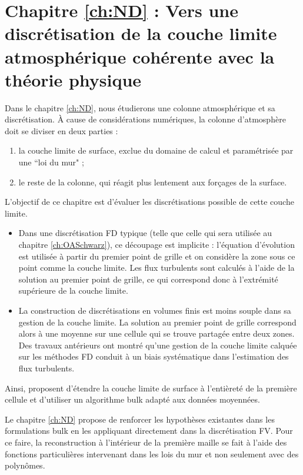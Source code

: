 \section*{Chapitre \ref{ch:ND} : Vers une discrétisation de la couche limite atmosphérique cohérente avec la théorie physique}
Dans le chapitre \ref{ch:ND}, nous étudierons une colonne atmosphérique et sa discrétisation.
À cause de considérations numériques, la colonne
d'atmosphère doit se diviser en deux parties :
\begin{enumerate}
	\item
	la couche limite de surface, exclue du domaine
	de calcul et paramétrisée par une ``loi du mur" ;
	\item
	le reste de la colonne, qui réagit plus lentement
	aux forçages de la surface.
\end{enumerate}
L'objectif de ce chapitre est d'évaluer les discrétisations possible
de cette couche limite.
\begin{itemize}
	\item
Dans une discrétisation FD typique (telle que celle qui sera
utilisée au chapitre \ref{ch:OASchwarz}), ce découpage est implicite :
l'équation d'évolution est utilisée à partir
du premier point de grille et on considère la zone
sous ce point comme la couche limite.
Les flux turbulents sont calculés à l'aide de la solution
	au premier point de grille, ce qui correspond donc à
	l'extrémité supérieure de la couche limite.
\item La construction de discrétisations en volumes finis
	est moins souple dans sa gestion de la couche limite.
	La solution au premier point de grille correspond
	alors à une moyenne sur une cellule qui se trouve
	partagée entre deux zones.
	Des travaux antérieurs ont montré qu'une gestion
	de la couche limite calquée sur les méthodes FD
	conduit à un biais systématique dans l'estimation
	des flux turbulents.
\end{itemize}
Ainsi, \citep{nishizawa_surface_2018} proposent
d'étendre la couche limite de surface à l'entièreté de
la première cellule et d'utiliser un algorithme bulk
adapté aux données moyennées.
\par
Le chapitre \ref{ch:ND} propose de renforcer les hypothèses
	existantes dans les formulations bulk en les
	appliquant directement dans la discrétisation FV.
	Pour ce faire, la reconstruction à l'intérieur
	de la première maille se fait à l'aide des fonctions
	particulières intervenant dans les lois du mur et
	non seulement avec des polynômes.
\par
